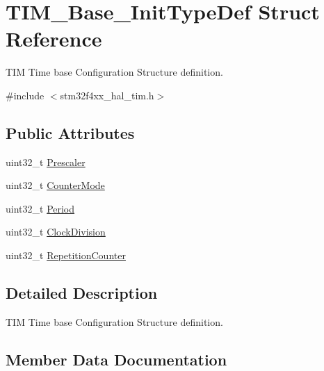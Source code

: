 \hypertarget{struct_t_i_m___base___init_type_def}{}\section{T\+I\+M\+\_\+\+Base\+\_\+\+Init\+Type\+Def Struct Reference}
\label{struct_t_i_m___base___init_type_def}


T\+IM Time base Configuration Structure definition.  




{\ttfamily \#include $<$stm32f4xx\+\_\+hal\+\_\+tim.\+h$>$}

\subsection*{Public Attributes}
\begin{DoxyCompactItemize}
\item 
uint32\+\_\+t \hyperlink{struct_t_i_m___base___init_type_def_afc886119e6709bb576d25b5cf8d12d92}{Prescaler}
\item 
uint32\+\_\+t \hyperlink{struct_t_i_m___base___init_type_def_a16d0c02a8f35426360a64c0706656e35}{Counter\+Mode}
\item 
uint32\+\_\+t \hyperlink{struct_t_i_m___base___init_type_def_a8fab2bc184bb756763ff59c729b5be55}{Period}
\item 
uint32\+\_\+t \hyperlink{struct_t_i_m___base___init_type_def_ade59c3a547a5409da845592f30596d17}{Clock\+Division}
\item 
uint32\+\_\+t \hyperlink{struct_t_i_m___base___init_type_def_aa949328175500fd1d112f64a4db5ae79}{Repetition\+Counter}
\end{DoxyCompactItemize}


\subsection{Detailed Description}
T\+IM Time base Configuration Structure definition. 

\subsection{Member Data Documentation}
